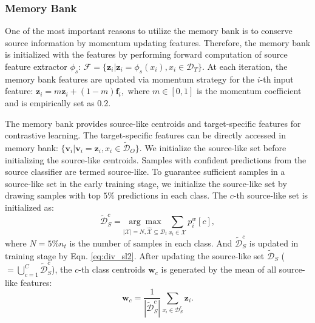 \documentclass{article}
\def\vf{{\bm{f}}}
\def\vv{{\bm{v}}}
\def\vw{{\bm{w}}}
\def\vz{{\bm{z}}}
\begin{document}
\subsubsection{Memory Bank}
One of the most important reasons to utilize the memory bank is to conserve source information by momentum updating features. 
Therefore, the memory bank is initialized with the features by performing forward computation of source feature extractor $\phi_s$: $\mathcal{F}=\{\vz_i | \vz_i = \phi_s(x_i),  x_i\in \mathcal{D}_T \}$.
At each iteration, the memory bank features are updated via momentum strategy for the $i$-th input feature:
$
    \vz_i = m \vz_i + (1-m) \vf_i,
$
where $m \in [0,1]$ is the momentum coefficient and is empirically set as 0.2.

The memory bank provides source-like centroids and target-specific features for contrastive learning. The target-specific features can be directly accessed in memory bank: $\{\vv_i|\vv_i = \vz_i, x_i \in \tilde{\mathcal{D}}_O\}$. We initialize the source-like set before initializing the source-like centroids. Samples with confident predictions from the source classifier are termed source-like.
To guarantee sufficient samples in a source-like set in the early training stage, we initialize the source-like set by drawing samples with top $5\%$ predictions in each class. The $c$-th source-like set is initialized as:
\begin{equation}
    \tilde{\mathcal{D}}^c_{S} =\underset{|{\mathcal{X}}|=N,\hat{\mathcal{X}}\subseteq\mathcal{D}_t}{\arg \max} \sum_{ x_i\in {\mathcal{X}}} p^w_i[c],
    \label{eq:div_sl1}
\end{equation}
where $N=5\%n_t$ is the number of samples in each class. And $\tilde{\mathcal{D}}^c_{S}$ is updated in training stage by Eqn. \ref{eq:div_sl2}. 
After updating the source-like set $\tilde{\mathcal{D}}_{S}$ ($ = \bigcup_{c=1}^C \tilde{\mathcal{D}}^c_{S}$), the $c$-th class centroids $\vw_c$ is generated by the mean of all source-like features:
\begin{equation}\label{eq:w_update}
    \vw_c = \frac{1}{|\tilde{\mathcal{D}}_{S}^c|} \sum_{x_i \in \mathcal{D}_{S}^c} \vz_i. 
\end{equation}
\end{document}
